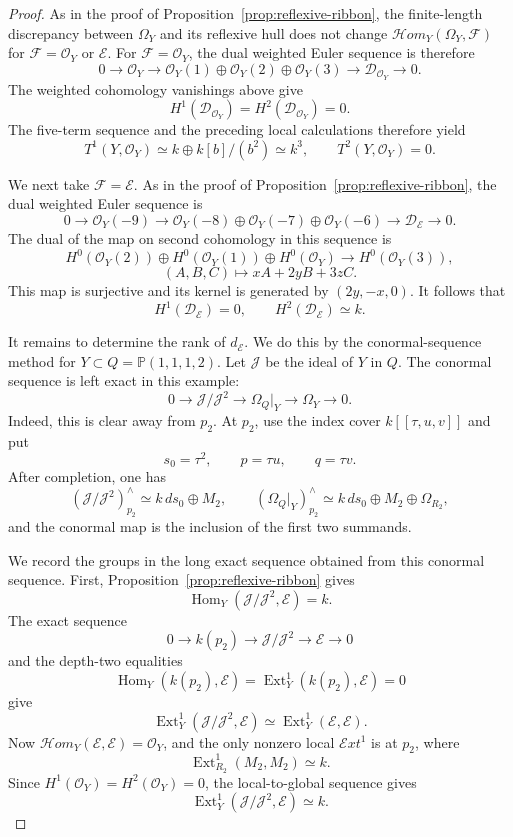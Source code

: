 \documentclass[11pt,twoside]{amsart}
\theoremstyle{plain}
\numberwithin{equation}{section}
\theoremstyle{definition}
\newcommand{\Ext}{\operatorname{Ext}}
\newcommand{\Hom}{\operatorname{Hom}}
\begin{document}
\begin{proof}
As in the proof of Proposition~\ref{prop:reflexive-ribbon}, the
finite-length discrepancy between $\Omega_Y$ and its reflexive hull does
not change $\mathcal H om_Y(\Omega_Y,\mathcal F)$ for
$\mathcal F=\mathcal O_Y$ or $\mathcal E$. For
$\mathcal F=\mathcal O_Y$, the dual weighted Euler sequence is therefore
$$
0\longrightarrow\mathcal O_Y
\longrightarrow
\mathcal O_Y(1)\oplus\mathcal O_Y(2)\oplus\mathcal O_Y(3)
\longrightarrow\mathcal D_{\mathcal O_Y}
\longrightarrow0.
$$
The weighted cohomology vanishings above give
$$
H^1(\mathcal D_{\mathcal O_Y})
=H^2(\mathcal D_{\mathcal O_Y})=0.
$$
The five-term sequence and the preceding local calculations therefore
yield
$$
T^1(Y,\mathcal O_Y)
\simeq k\oplus k[b]/(b^2)
\simeq k^3,
\qquad
T^2(Y,\mathcal O_Y)=0.
$$

We next take $\mathcal F=\mathcal E$. As in the proof of
Proposition~\ref{prop:reflexive-ribbon}, the dual weighted Euler sequence
is
$$
0\longrightarrow\mathcal O_Y(-9)
\longrightarrow
\mathcal O_Y(-8)\oplus
\mathcal O_Y(-7)\oplus
\mathcal O_Y(-6)
\longrightarrow\mathcal D_{\mathcal E}
\longrightarrow0.
$$
The dual of the map on second cohomology in this sequence is
$$
H^0(\mathcal O_Y(2))\oplus
H^0(\mathcal O_Y(1))\oplus
H^0(\mathcal O_Y)
\longrightarrow
H^0(\mathcal O_Y(3)),
$$
$$
(A,B,C)\longmapsto xA+2yB+3zC.
$$
This map is surjective and its kernel is generated by $(2y,-x,0)$.
It follows that
$$
H^1(\mathcal D_{\mathcal E})=0,
\qquad
H^2(\mathcal D_{\mathcal E})\simeq k.
$$

It remains to determine the rank of $d_{\mathcal E}$. We do this by the
conormal-sequence method for
$Y\subset Q=\mathbb P(1,1,1,2)$. Let $\mathcal J$ be the ideal of $Y$ in
$Q$. The conormal sequence is left exact in this example:
$$
0\longrightarrow\mathcal J/\mathcal J^2
\longrightarrow\Omega_Q|_Y
\longrightarrow\Omega_Y
\longrightarrow0.
$$
Indeed, this is clear away from $p_2$. At $p_2$, use the index cover
$k[[\tau,u,v]]$ and put
$$
s_0=\tau^2,\qquad p=\tau u,\qquad q=\tau v.
$$
After completion, one has
$$
(\mathcal J/\mathcal J^2)_{p_2}^{\wedge}
\simeq k\,ds_0\oplus M_2,
\qquad
(\Omega_Q|_Y)_{p_2}^{\wedge}
\simeq k\,ds_0\oplus M_2\oplus\Omega_{R_2},
$$
and the conormal map is the inclusion of the first two summands.

We record the groups in the long exact sequence obtained from this
conormal sequence. First,
Proposition~\ref{prop:reflexive-ribbon} gives
$$
\Hom_Y(\mathcal J/\mathcal J^2,\mathcal E)=k.
$$
The exact sequence
$$
0\longrightarrow k(p_2)
\longrightarrow\mathcal J/\mathcal J^2
\longrightarrow\mathcal E
\longrightarrow0
$$
and the depth-two equalities
$$
\Hom_Y(k(p_2),\mathcal E)
=\Ext^1_Y(k(p_2),\mathcal E)=0
$$
give
$$
\Ext^1_Y(\mathcal J/\mathcal J^2,\mathcal E)
\simeq\Ext^1_Y(\mathcal E,\mathcal E).
$$
Now $\mathcal H om_Y(\mathcal E,\mathcal E)=\mathcal O_Y$, and the only
nonzero local $\mathcal E xt^1$ is at $p_2$, where
$$
\Ext^1_{R_2}(M_2,M_2)\simeq k.
$$
Since $H^1(\mathcal O_Y)=H^2(\mathcal O_Y)=0$, the local-to-global
sequence gives
$$
\Ext^1_Y(\mathcal J/\mathcal J^2,\mathcal E)\simeq k.
$$


\end{proof}
\end{document}
